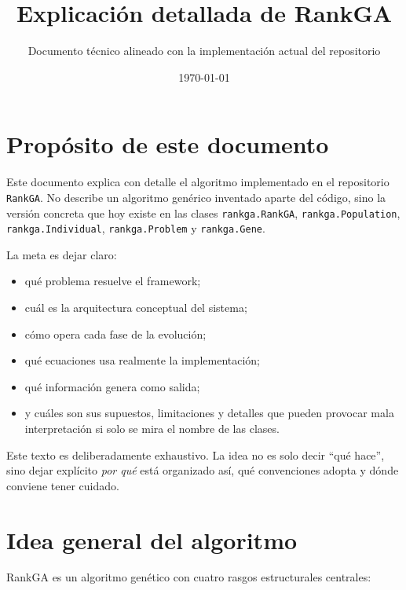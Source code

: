\documentclass[11pt]{article}
\title{Explicaci\'on detallada de RankGA}
\author{Documento t\'ecnico alineado con la implementaci\'on actual del repositorio}
\date{\today}
\begin{document}
\maketitle

\section{Prop\'osito de este documento}

Este documento explica con detalle el algoritmo implementado en el repositorio
\texttt{RankGA}. No describe un algoritmo gen\'erico inventado aparte del
c\'odigo, sino la versi\'on concreta que hoy existe en las clases
\texttt{rankga.RankGA}, \texttt{rankga.Population},
\texttt{rankga.Individual}, \texttt{rankga.Problem} y \texttt{rankga.Gene}.

La meta es dejar claro:

\begin{itemize}
  \item qu\'e problema resuelve el framework;
  \item cu\'al es la arquitectura conceptual del sistema;
  \item c\'omo opera cada fase de la evoluci\'on;
  \item qu\'e ecuaciones usa realmente la implementaci\'on;
  \item qu\'e informaci\'on genera como salida;
  \item y cu\'ales son sus supuestos, limitaciones y detalles que pueden
  provocar mala interpretaci\'on si solo se mira el nombre de las clases.
\end{itemize}

Este texto es deliberadamente exhaustivo. La idea no es solo decir ``qu\'e
hace'', sino dejar expl\'icito \emph{por qu\'e} est\'a organizado as\'i, qu\'e
convenciones adopta y d\'onde conviene tener cuidado.

\section{Idea general del algoritmo}

RankGA es un algoritmo gen\'etico con cuatro rasgos estructurales centrales:
\end{document}
